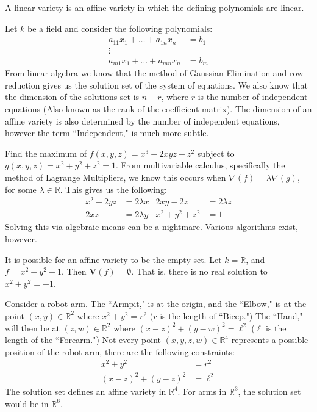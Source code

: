 \documentclass[crop=false,class=article,oneside]{standalone}
\begin{document}
    \begin{definition}
    A linear variety is an affine variety in which the defining polynomials are linear.
    \end{definition}
    \begin{example}
    Let $k$ be a field and consider the following polynomials:
    \begin{align*}
        a_{11}x_{1}+\hdots+a_{1n}x_{n}&=b_{1}\\
        \vdots&\\
        a_{m1}x_{1}+\hdots+a_{mn}x_{n}&=b_{m}
    \end{align*}
    From linear algebra we know that the method of Gaussian Elimination and row-reduction gives us the solution set of the system of equations. We also know that the dimension of the solutions set is $n-r$, where $r$ is the number of independent equations (Also known as the rank of the coefficient matrix). The dimension of an affine variety is also determined by the number of independent equations, however the term ``Independent," is much more subtle.
    \end{example}
    \begin{example}
    Find the maximum of $f(x,y,z) = x^3+2xyz-z^2$ subject to $g(x,y,z) = x^2+y^2+z^2=1$. From multivariable calculus, specifically the method of Lagrange Multipliers, we know this occurs when $\nabla(f) = \lambda \nabla(g)$, for some $\lambda \in \mathbb{R}$. This gives us the following:
    \begin{align*}
        x^{2}+2yz&=2\lambda x & 2xy-2z&=2\lambda z\\
        2xz&=2\lambda y & x^{2}+y^{2}+z^2&=1
    \end{align*}
    Solving this via algebraic means can be a nightmare. Various algorithms exist, however.
    \end{example}
    \begin{remark}
    It is possible for an affine variety to be the empty set. Let $k=\mathbb{R}$, and $f=x^{2}+y^{2}+1$. Then $\mathbf{V}(f)=\emptyset$. That is, there is no real solution to $x^2+y^2 = -1$.
    \end{remark}
    \begin{example}
    Consider a robot arm. The ``Armpit," is at the origin, and the ``Elbow," is at the point $(x,y)\in \mathbb{R}^2$ where $x^2+y^2 = r^2$ ($r$ is the length of ``Bicep.") The ``Hand," will then be at $(z,w)\in \mathbb{R}^2$ where $(x-z)^2 + (y-w)^2 = \ell^2$ ($\ell$ is the length of the ``Forearm.") Not every point $(x,y,z,w)\in \mathbb{R}^4$ represents a possible position of the robot arm, there are the following constraints:
    \begin{align*}
        x^{2}+y^{2}&=r^{2}\\ 
        (x-z)^{2}+(y-z)^{2}&=\ell^{2}
    \end{align*}
    The solution set defines an affine variety in $\mathbb{R}^4$. For arms in $\mathbb{R}^3$, the solution set would be in $\mathbb{R}^6$.
    \end{example}
\end{document}
